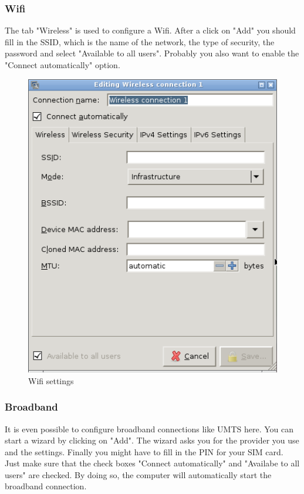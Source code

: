 \documentclass[a4paper,12pt,twoside]{article}
\begin{document}
\subsubsection{Wifi}
\label{sct:wifi}
The tab "Wireless" is used to configure a
Wifi. After a click on "Add" you should
fill in the SSID, which is the name of the network, the type of
security, the password and select "Available to all
users". Probably you also want to enable the
"Connect automatically" option.

\begin{figure}
    \centering
    \includegraphics[width=13cm]{efaLiveen-img/efaLiveen-img25.png}
    \caption{Wifi settings}
    \label{fig:wifi}
\end{figure}


\subsubsection{Broadband}
\label{sct:broadband}
It is even possible to configure broadband connections like UMTS here.
You can start a wizard by clicking on
"Add". The wizard asks you for the provider
you use and the settings. Finally you might have to fill in the PIN for
your SIM card. Just make sure that the check boxes "Connect automatically"
and "Availabe to all users" are checked. By doing so, the computer will
automatically start the broadband connection.
\end{document}
